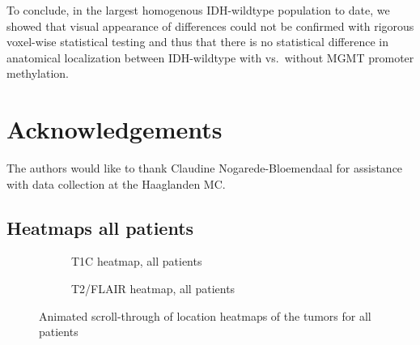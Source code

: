 To conclude, in the largest homogenous \gls{IDH}-wildtype  population to date, we showed that visual appearance of differences could not be confirmed with rigorous voxel-wise statistical testing and thus that there is no statistical difference in anatomical localization between \gls{IDH}-wildtype  with vs.\ without \gls{MGMT} promoter methylation.

\section*{Acknowledgements}

The authors would like to thank Claudine Nogarede-Bloemendaal for assistance with data collection at the Haaglanden MC\@.


\newpage
\begin{subappendices}

    \section{Heatmaps all patients}
    \begin{figure}[H]
        \centering
        \begin{subfigure}[t]{0.4\textwidth}
            \centering
            \caption{\acrshort{T1C} heatmap, all patients}\label{fig:HGG_loc_T1_heatmap_all}
        \end{subfigure}
        \hfill
        \begin{subfigure}[t]{0.4\textwidth}
            \centering
            \caption{\acrshort{T2}/\acrshort{FLAIR} heatmap, all patients}\label{fig:HGG_loc_T2_heatmap_all}
        \end{subfigure}
        \caption{Animated scroll-through of location heatmaps of the \glspl{tumor} for all patients}\label{fig:HGG_local_heatmaps_full_all}
    \end{figure}

    \newpage


\end{subappendices}
